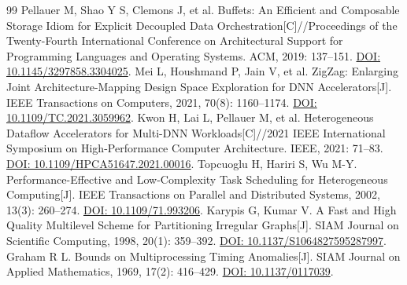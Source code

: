 \begin{thebibliography}{99}
 Pellauer M, Shao Y S, Clemons J, et al. Buffets: An Efficient and Composable Storage Idiom for Explicit Decoupled Data Orchestration[C]//Proceedings of the Twenty-Fourth International Conference on Architectural Support for Programming Languages and Operating Systems. ACM, 2019: 137--151. \href{https://doi.org/10.1145/3297858.3304025}{DOI: 10.1145/3297858.3304025}.
 Mei L, Houshmand P, Jain V, et al. ZigZag: Enlarging Joint Architecture-Mapping Design Space Exploration for DNN Accelerators[J]. IEEE Transactions on Computers, 2021, 70(8): 1160--1174. \href{https://doi.org/10.1109/TC.2021.3059962}{DOI: 10.1109/TC.2021.3059962}.
 Kwon H, Lai L, Pellauer M, et al. Heterogeneous Dataflow Accelerators for Multi-DNN Workloads[C]//2021 IEEE International Symposium on High-Performance Computer Architecture. IEEE, 2021: 71--83. \href{https://doi.org/10.1109/HPCA51647.2021.00016}{DOI: 10.1109/HPCA51647.2021.00016}.
 Topcuoglu H, Hariri S, Wu M-Y. Performance-Effective and Low-Complexity Task Scheduling for Heterogeneous Computing[J]. IEEE Transactions on Parallel and Distributed Systems, 2002, 13(3): 260--274. \href{https://doi.org/10.1109/71.993206}{DOI: 10.1109/71.993206}.
 Karypis G, Kumar V. A Fast and High Quality Multilevel Scheme for Partitioning Irregular Graphs[J]. SIAM Journal on Scientific Computing, 1998, 20(1): 359--392. \href{https://doi.org/10.1137/S1064827595287997}{DOI: 10.1137/S1064827595287997}.
 Graham R L. Bounds on Multiprocessing Timing Anomalies[J]. SIAM Journal on Applied Mathematics, 1969, 17(2): 416--429. \href{https://doi.org/10.1137/0117039}{DOI: 10.1137/0117039}.
\end{thebibliography}
